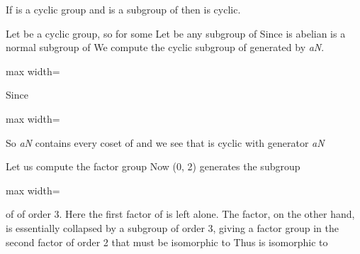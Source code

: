 \documentclass[11pt,oneside]{article}
\begin{document}
\begin{BookBody}

 If  is a cyclic group and  is a subgroup of  then  is cyclic.

 Let  be a cyclic group, so  for some  Let  be any subgroup of  Since  is abelian is a normal subgroup of  We compute the cyclic subgroup of  generated by\textit{ aN}.

\begin{center}\begin{adjustbox}{max width=\linewidth}\end{adjustbox}\end{center}

\noindent Since 

\begin{center}\begin{adjustbox}{max width=\linewidth}\end{adjustbox}\end{center}

\noindent So \BookInline{\langle }\textit{aN}\BookInline{\rangle } contains every coset of  and we see that  is cyclic with generator \BookInline{\langle }\textit{aN} \BookEnd{\blacklozenge}

 Let us compute the factor group  Now (0, 2) generates the subgroup

\begin{center}\begin{adjustbox}{max width=\linewidth}\end{adjustbox}\end{center}

\noindent of  of order 3. Here the first factor  of  is left alone. The  factor, on the other hand, is essentially collapsed by a subgroup of order 3, giving a factor group in the second factor of order 2 that must be isomorphic to  Thus  is isomorphic to 


\end{BookBody}
\end{document}
